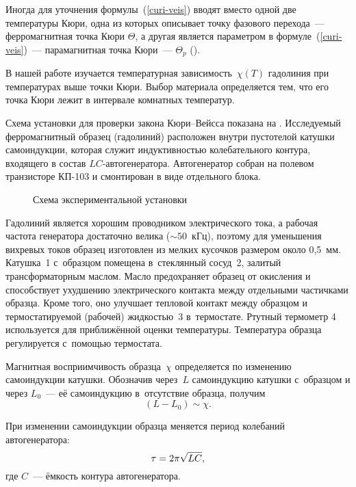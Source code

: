 Иногда для уточнения формулы~(\eqref{curi-veis}) вводят вместо одной две температуры Кюри, одна из которых описывает точку фазового
перехода~--- ферромагнитная точка Кюри $\Theta$, а другая является параметром в формуле~(\eqref{curi-veis})~--- парамагнитная точка
Кюри~--- $\Theta_p$ ().

В нашей работе изучается температурная зависимость~$\chi(T)$ гадолиния при температурах выше точки Кюри. Выбор материала
определяется тем, что его точка Кюри лежит в интервале комнатных температур.

\experiment

Схема установки для проверки закона Кюри--Вейсса показана на . Исследуемый ферромагнитный образец (гадолиний)
расположен внутри пустотелой катушки самоиндукции, которая служит индуктивностью колебательного контура, входящего в
состав $LC$-автогенератора. Автогенератор собран на полевом транзисторе КП-103 и смонтирован в виде отдельного блока.

\begin{figure}
	\caption{Схема экспериментальной установки}
\end{figure}

Гадолиний является хорошим проводником электрического тока, а рабочая частота генератора достаточно велика
(${\sim}50$~кГц), поэтому для уменьшения вихревых токов образец изготовлен из мелких кусочков размером около 0,5~мм.
Катушка~1 с~образцом помещена в~стеклянный сосуд~2, залитый трансформаторным маслом. Масло предохраняет образец от
окисления и способствует ухудшению электрического контакта между отдельными частичками образца. Кроме того, оно улучшает
тепловой контакт между образцом и термостатируемой (рабочей) жидкостью~3 в~термостате. Ртутный термометр 4 используется
для приближённой оценки температуры. Температура образца регулируется с~помощью термостата.%

Магнитная восприимчивость образца~$\chi$ определяется по изменению самоиндукции катушки. Обозначив через~$L$
самоиндукцию катушки с~образцом и через $L_0$~--- её самоиндукцию в~отсутствие образца, получим
\begin{equation}%
	(L-L_0)\sim\chi.
\end{equation}

При изменении самоиндукции образца меняется период колебаний автогенератора:
\begin{equation}%
	\tau=2\pi\sqrt{LC},
	\eqmark{4}
\end{equation}
где $C$~--- ёмкость контура автогенератора.

